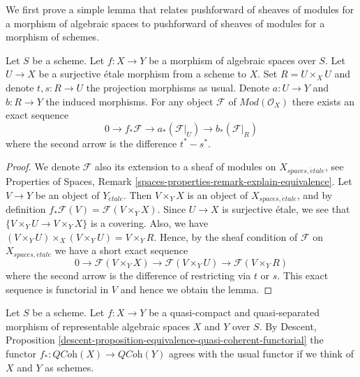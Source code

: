 \noindent
We first prove a simple lemma that relates pushforward of sheaves of modules
for a morphism of algebraic spaces to pushforward of sheaves of modules for
a morphism of schemes.

\begin{lemma}
\label{lemma-compute-pushforward}
Let $S$ be a scheme.
Let $f : X \to Y$ be a morphism of algebraic spaces over $S$.
Let $U \to X$ be a surjective \'etale morphism from a scheme to $X$.
Set $R = U \times_X U$ and denote $t, s : R \to U$ the projection
morphisms as usual. Denote $a : U \to Y$ and $b : R \to Y$ the induced
morphisms. For any object $\mathcal{F}$ of $\textit{Mod}(\mathcal{O}_X)$
there exists an exact sequence
$$
0 \to f_*\mathcal{F} \to a_*(\mathcal{F}|_U) \to b_*(\mathcal{F}|_R)
$$
where the second arrow is the difference $t^* - s^*$.
\end{lemma}

\begin{proof}
We denote $\mathcal{F}$ also its extension to a sheaf of modules on
$X_{spaces, \acute{e}tale}$, see
Properties of Spaces,
Remark \ref{spaces-properties-remark-explain-equivalence}.
Let $V \to Y$ be an object of $Y_{\acute{e}tale}$. Then $V \times_Y X$ is an
object of $X_{spaces, \acute{e}tale}$, and by definition
$f_*\mathcal{F}(V) = \mathcal{F}(V \times_Y X)$. Since $U \to X$ is
surjective \'etale, we see that $\{V \times_Y U \to V \times_Y X\}$
is a covering. Also, we have
$(V \times_Y U) \times_X (V \times_Y U) = V \times_Y R$.
Hence, by the sheaf condition of $\mathcal{F}$ on
$X_{spaces, \acute{e}tale}$ we have a short exact sequence
$$
0 \to \mathcal{F}(V \times_Y X)
\to \mathcal{F}(V \times_Y U) \to \mathcal{F}(V \times_Y R)
$$
where the second arrow is the difference of restricting via $t$ or $s$.
This exact sequence is functorial in $V$ and hence we obtain the lemma.
\end{proof}

\noindent
Let $S$ be a scheme. Let $f : X \to Y$ be a quasi-compact and
quasi-separated morphism of representable algebraic spaces $X$
and $Y$ over $S$. By
Descent,
Proposition \ref{descent-proposition-equivalence-quasi-coherent-functorial}
the functor $f_* : \textit{QCoh}(X) \to \textit{QCoh}(Y)$ agrees with the
usual functor if we think of $X$ and $Y$ as schemes.

